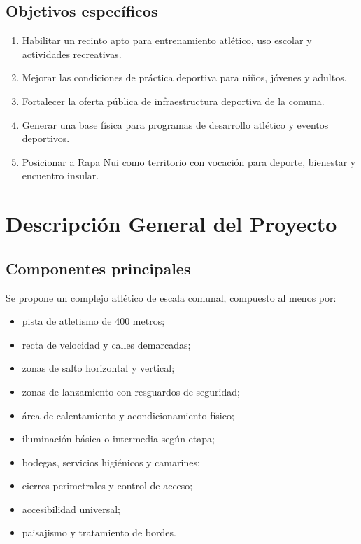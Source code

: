 \documentclass[12pt,letterpaper]{article}
\begin{document}
\subsection{Objetivos específicos}

\begin{enumerate}
    \item Habilitar un recinto apto para entrenamiento atlético, uso escolar y actividades recreativas.
    \item Mejorar las condiciones de práctica deportiva para niños, jóvenes y adultos.
    \item Fortalecer la oferta pública de infraestructura deportiva de la comuna.
    \item Generar una base física para programas de desarrollo atlético y eventos deportivos.
    \item Posicionar a Rapa Nui como territorio con vocación para deporte, bienestar y encuentro insular.
\end{enumerate}

\section{Descripción General del Proyecto}

\subsection{Componentes principales}

Se propone un complejo atlético de escala comunal, compuesto al menos por:

\begin{itemize}
    \item pista de atletismo de 400 metros;
    \item recta de velocidad y calles demarcadas;
    \item zonas de salto horizontal y vertical;
    \item zonas de lanzamiento con resguardos de seguridad;
    \item área de calentamiento y acondicionamiento físico;
    \item iluminación básica o intermedia según etapa;
    \item bodegas, servicios higiénicos y camarines;
    \item cierres perimetrales y control de acceso;
    \item accesibilidad universal;
    \item paisajismo y tratamiento de bordes.
\end{itemize}
\end{document}
